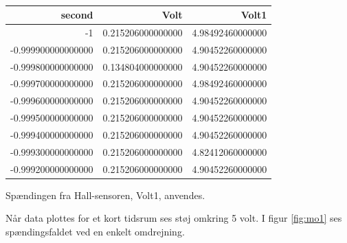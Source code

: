 \begin{table}[h]
  \centering
\begin{tabular}{r|r|r}
\hline
\textbf{second} & \textbf{Volt} & \textbf{Volt1} \\
\hline
-1 & 0.215206000000000 & 4.98492460000000 \\
-0.999900000000000 & 0.215206000000000 & 4.90452260000000 \\
-0.999800000000000 & 0.134804000000000 & 4.90452260000000 \\
-0.999700000000000 & 0.215206000000000 & 4.98492460000000 \\
-0.999600000000000 & 0.215206000000000 & 4.90452260000000 \\
-0.999500000000000 & 0.215206000000000 & 4.90452260000000 \\
-0.999400000000000 & 0.215206000000000 & 4.90452260000000 \\
-0.999300000000000 & 0.215206000000000 & 4.82412060000000 \\
-0.999200000000000 & 0.215206000000000 & 4.90452260000000 \\
\hline
\end{tabular}
  \caption{}
  \label{tab:komp3}
\end{table}

Spændingen fra Hall-sensoren, Volt1, anvendes.

Når data plottes for et kort tidsrum ses støj omkring 5 volt. I figur \ref{fig:mo1} ses spændingsfaldet ved en enkelt omdrejning.

